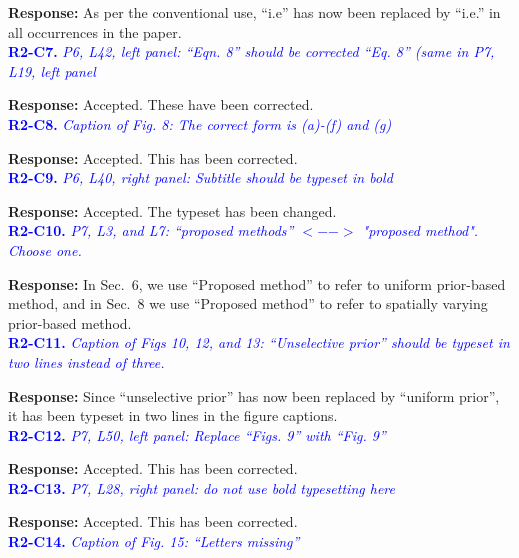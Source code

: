 \documentclass{article}
\begin{document}
 \textbf{Response:} As per the conventional use, ``i.e'' has now been replaced by ``i.e.'' in all occurrences in the paper.\\

\textcolor{blue}{\textbf{R2-C7.}\textit{ P6, L42, left panel: ``Eqn. 8'' should be corrected ``Eq. 8'' (same in P7, L19, left panel}}

  \textbf{Response:} Accepted. These have been corrected.\\
 
 \textcolor{blue}{\textbf{R2-C8.}\textit{ Caption of Fig. 8: The correct form is (a)-(f) and (g)}}

  \textbf{Response:} Accepted. This has been corrected.\\
 
 \textcolor{blue}{\textbf{R2-C9.}\textit{ P6, L40, right panel: Subtitle should be typeset in bold}}
 
  \textbf{Response:} Accepted. The typeset has been changed.\\

 \textcolor{blue}{\textbf{R2-C10.}\textit{ P7, L3, and L7: ``proposed methods'' $<-->$ "proposed method". Choose one.}}
 
 \textbf{Response:} In Sec.~6, we use ``Proposed method'' to refer to uniform prior-based method, and in Sec.~8 we use ``Proposed method'' to refer to spatially varying prior-based method.\\

\textcolor{blue}{\textbf{R2-C11.}\textit{ Caption of Figs 10, 12, and 13: ``Unselective prior'' should be typeset in two lines instead of three.}}

  \textbf{Response:} Since ``unselective prior'' has now been replaced by ``uniform prior'', it has been typeset in two lines in the figure captions.\\

 \textcolor{blue}{\textbf{R2-C12.}\textit{ P7, L50, left panel: Replace ``Figs. 9'' with ``Fig. 9''}}
 
  \textbf{Response:} Accepted. This has been corrected.\\
 
 \textcolor{blue}{\textbf{R2-C13.}\textit{ P7, L28, right panel: do not use bold typesetting here}}
 
  \textbf{Response:} Accepted. This has been corrected.\\

 \textcolor{blue}{\textbf{R2-C14.}\textit{ Caption of Fig. 15: ``Letters missing''}}
 
\end{document}
